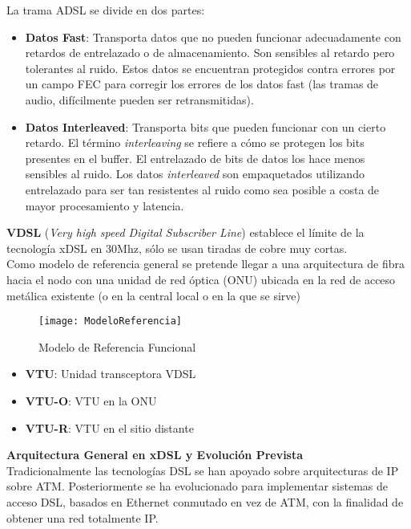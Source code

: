 \documentclass[10pt,portrait, twocolumn]{article}
\begin{document}
La trama ADSL se divide en dos partes:

	\begin{itemize}
		\item \textbf{Datos Fast}: Transporta datos que no pueden funcionar adecuadamente con retardos de entrelazado o de almacenamiento. Son sensibles al retardo pero tolerantes al ruido. Estos datos se encuentran protegidos contra errores por un campo FEC para corregir los errores de los datos fast (las tramas de audio, difícilmente pueden ser retransmitidas).
		\item \textbf{Datos Interleaved}: Transporta bits que pueden funcionar con un cierto retardo. El término \textit{interleaving} se refiere a cómo se protegen los bits presentes en el buffer. El entrelazado de bits de datos los hace menos sensibles al ruido. Los datos \textit{interleaved} son empaquetados utilizando entrelazado para ser tan resistentes al ruido como sea posible a costa de mayor procesamiento y latencia.
	\end{itemize}
	
\textbf{VDSL} (\textit{Very high speed Digital Subscriber Line})	establece el límite de la tecnología xDSL en 30Mhz, sólo se usan tiradas de cobre muy cortas.\\

Como modelo de referencia general se pretende llegar a una arquitectura de fibra hacia el nodo con una unidad de red óptica (ONU) ubicada en la red de acceso metálica existente (o en la central local o en la que se sirve)

\begin{figure}[h]	
	\centering
    	\texttt{[image: ModeloReferencia]}
	\caption{Modelo de Referencia Funcional}
	\label{fig:ONT}
  \end{figure}	
	
	\begin{itemize}
		\item \textbf{VTU}: Unidad transceptora VDSL
		\item \textbf{VTU-O}: VTU en la ONU
		\item \textbf{VTU-R}: VTU en el sitio distante
	\end{itemize}
	  
\textbf{Arquitectura General en xDSL y Evolución Prevista}\\
  
Tradicionalmente las tecnologías DSL se han apoyado sobre arquitecturas de IP sobre ATM. Posteriormente se ha evolucionado para implementar sistemas de acceso DSL, basados en Ethernet conmutado en vez de ATM, con la finalidad de obtener una red totalmente IP.\\
\end{document}
